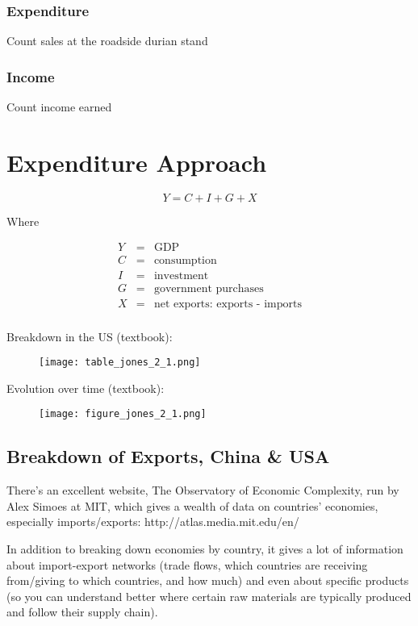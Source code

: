 \documentclass{article}
\begin{document}
\subsubsection*{Expenditure}
Count sales at the roadside durian stand

\subsubsection*{Income}
Count income earned

\section*{Expenditure Approach}

\[
Y = C + I + G + X
\]

Where

\begin{eqnarray*}
Y & = & \mbox{GDP} \\
C & = & \mbox{consumption} \\
I & = & \mbox{investment} \\
G & = & \mbox{government purchases} \\
X & = & \mbox{net exports: exports - imports} \\	
\end{eqnarray*}

Breakdown in the US (textbook):

\begin{figure}[h]
\texttt{[image: table\_jones\_2\_1.png]}
\end{figure}

Evolution over time (textbook):

\begin{figure}[h]
\texttt{[image: figure\_jones\_2\_1.png]}
\end{figure}

\subsection*{Breakdown of Exports, China \& USA}

There's an excellent website, The Observatory of Economic Complexity, run by Alex Simoes at MIT, which gives a wealth of data on countries' economies, especially imports/exports: http://atlas.media.mit.edu/en/

In addition to breaking down economies by country, it gives a lot of information about import-export networks (trade flows, which countries are receiving from/giving to which countries, and how much) and even about specific products (so you can understand better where certain raw materials are typically produced and follow their supply chain).
\end{document}
